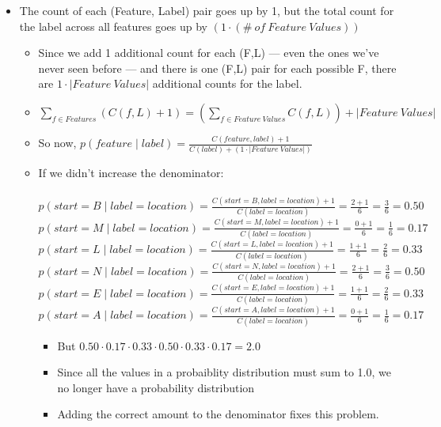 \documentclass[11pt,letterpaper]{article}
\begin{document}
\begin{itemize}
  \item The count of each (Feature, Label) pair goes up by 1, but the total count for the label across all features goes up by $(1 \cdot (\#~of~Feature~Values))$
    \begin{itemize}
      \item Since we add 1 additional count for each (F,L) --- even the ones we've never seen before --- and there is one (F,L) pair for each possible F, there are $1 \cdot |Feature~Values|$ additional counts for the label.
      \item $\sum_{f \in Features} (C(f,L)+1) = \left(\sum_{f \in Feature~Values} C(f,L)\right) + |Feature~Values|$
      \item So now, $p(feature \mid label) = \frac{C(feature,label)+1}{C(label) + (1 \cdot |Feature~Values|)}$
      \\
      \item If we didn't increase the denominator: \\\\
          $p(start=B \mid label=location) = \frac{C(start=B, label=location)+1}{C(label=location)} = \frac{2+1}{6} = \frac{3}{6} = 0.50$ \\
          $p(start=M \mid label=location) = \frac{C(start=M, label=location)+1}{C(label=location)} = \frac{0+1}{6} = \frac{1}{6} = 0.17$ \\
          $p(start=L \mid label=location) = \frac{C(start=L, label=location)+1}{C(label=location)} = \frac{1+1}{6} = \frac{2}{6} = 0.33$ \\
          $p(start=N \mid label=location) = \frac{C(start=N, label=location)+1}{C(label=location)} = \frac{2+1}{6} = \frac{3}{6} = 0.50$ \\
          $p(start=E \mid label=location) = \frac{C(start=E, label=location)+1}{C(label=location)} = \frac{1+1}{6} = \frac{2}{6} = 0.33$ \\
          $p(start=A \mid label=location) = \frac{C(start=A, label=location)+1}{C(label=location)} = \frac{0+1}{6} = \frac{1}{6} = 0.17$
        \begin{itemize}
          \item But $0.50 \cdot 0.17 \cdot 0.33 \cdot 0.50 \cdot 0.33 \cdot 0.17 = 2.0$ 
          \item Since all the values in a probaiblity distribution must sum to 1.0, we no longer have a probability distribution
          \item Adding the correct amount to the denominator fixes this problem.
        \end{itemize}
    \end{itemize}


\end{itemize}
\end{document}
